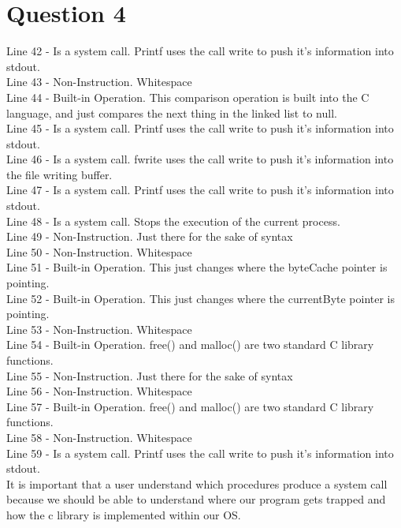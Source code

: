 \documentclass[12pt]{extarticle}
\begin{document}
	\section*{Question 4}
		Line 42 - Is a system call.  Printf uses the call write to push it's information into stdout.\\
		Line 43 - Non-Instruction.  Whitespace\\
		Line 44 - Built-in Operation.  This comparison operation is built into the C language, and just compares the next thing in the linked list to null.\\
		Line 45 - Is a system call.  Printf uses the call write to push it's information into stdout.\\
		Line 46 - Is a system call.  fwrite uses the call write to push it's information into the file writing buffer.\\
		Line 47 - Is a system call.  Printf uses the call write to push it's information into stdout.\\
		Line 48 - Is a system call.  Stops the execution of the current process.\\
		Line 49 - Non-Instruction.  Just there for the sake of syntax\\
		Line 50 - Non-Instruction.  Whitespace\\
		Line 51 - Built-in Operation.  This just changes where the byteCache pointer is pointing.\\
		Line 52 - Built-in Operation.  This just changes where the currentByte pointer is pointing.\\
		Line 53 - Non-Instruction.  Whitespace\\
		Line 54 - Built-in Operation.  free() and malloc() are two standard C library functions.\\
		Line 55 - Non-Instruction.  Just there for the sake of syntax\\
		Line 56 - Non-Instruction.  Whitespace\\
		Line 57 - Built-in Operation.  free() and malloc() are two standard C library functions.\\
		Line 58 - Non-Instruction.  Whitespace\\
		Line 59 - Is a system call.  Printf uses the call write to push it's information into stdout.\\

		It is important that a user understand which procedures produce a system call because we should be able to understand where our program gets trapped and how the c library is implemented within our OS.
\end{document}
